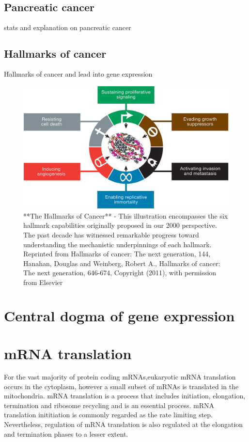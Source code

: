 \documentclass[12pt,openany]{book}
\begin{document}
\subsection{Pancreatic cancer}

stats and explanation on pancreatic cancer

\subsection{Hallmarks of cancer}

Hallmarks of cancer and lead into gene expression

\begin{figure}
  \includegraphics{./figures/hallmarks.jpg}
  \caption{**The Hallmarks of Cancer** - This illustration encompasses the six hallmark capabilities originally proposed in our 2000 perspective. The past decade has witnessed remarkable progress toward understanding the mechanistic underpinnings of each hallmark. Reprinted from Hallmarks of cancer: The next generation, 144, Hanahan, Douglas and Weinberg, Robert A., Hallmarks of cancer: The next generation, 646-674, Copyright (2011), with permission from Elsevier \label{HOC}}
\end{figure}

\section{Central dogma of gene expression}

\section{mRNA translation}

For the vast majority of protein coding mRNAs,eukaryotic mRNA
translation occurs in the cytoplasm, however a small subset of mRNAs is
translated in the mitochondria. mRNA translation is a process that
includes initiation, elongation, termination and ribosome recycling and
is an essential process. mRNA translation inititiation is commonly
regarded as the rate limiting step. Nevertheless, regulation of mRNA
translation is also regulated at the elongation and termination phases
to a lesser extent.
\end{document}

